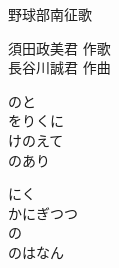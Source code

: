 \documentclass[10pt,b5j]{tarticle} %
\begin{document}
\begin{minipage}[c]{0.7\hsize} %
    \begin{center}
        {\LARGE
            野球部南征歌 %
        }
        {\small 
        }
    \end{center}
\end{minipage}
\begin{minipage}[c]{0.3\hsize} %
    \begin{flushright} %
        須田政美君 作歌\\長谷川誠君 作曲 %
    \end{flushright}
\end{minipage}

\vspace{1.5em} %
\newcommand{\linespace}{0.5em} %
\newcommand{\blocksize}{0.5\hsize} %
\begin{enumerate} %
    \begin{minipage}[c]{\blocksize}
    
        \vspace{\linespace}
        \item
        のと\\
        をりくに\\
        けのえて\\
        のあり
        
        \vspace{\linespace}
        \item
        にく\\
        かにぎつつ\\
        の\\
        のはなん
    
    \end{minipage}
\end{enumerate} %
\end{document}
